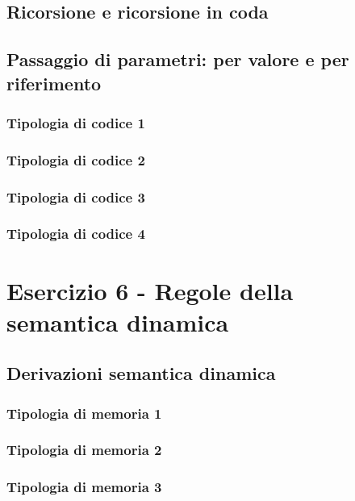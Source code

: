 \documentclass[a4paper]{article}
\begin{document}
	\subsection{Ricorsione e ricorsione in coda}
	
	\subsection{Passaggio di parametri: per valore e per riferimento}
	
	\subsubsection{Tipologia di codice 1}
	
	\subsubsection{Tipologia di codice 2}
	
	\subsubsection{Tipologia di codice 3}
	
	\subsubsection{Tipologia di codice 4}
	
	\section{Esercizio 6 - Regole della semantica dinamica}
	
	\subsection{Derivazioni semantica dinamica}
	
	\subsubsection{Tipologia di memoria 1}
	
	\subsubsection{Tipologia di memoria 2}
	
	\subsubsection{Tipologia di memoria 3}
	
\end{document}
